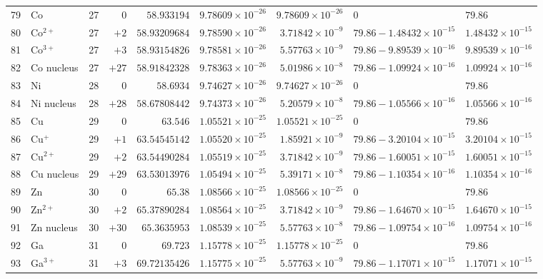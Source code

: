 {\begin{tabular}{@{}r l r r r r r l l@{}}
79 & Co & 27 & $0$ & $58.933194$ & $9.78609{\times}10^{-26}$ & $9.78609{\times}10^{-26}$ & $0$ & $79.86$ \\
80 & Co$^{2+}$ & 27 & $+2$ & $58.93209684$ & $9.78590{\times}10^{-26}$ & $3.71842{\times}10^{-9}$ & $79.86 - 1.48432{\times}10^{-15}$ & $1.48432{\times}10^{-15}$ \\
81 & Co$^{3+}$ & 27 & $+3$ & $58.93154826$ & $9.78581{\times}10^{-26}$ & $5.57763{\times}10^{-9}$ & $79.86 - 9.89539{\times}10^{-16}$ & $9.89539{\times}10^{-16}$ \\
82 & Co nucleus & 27 & $+27$ & $58.91842328$ & $9.78363{\times}10^{-26}$ & $5.01986{\times}10^{-8}$ & $79.86 - 1.09924{\times}10^{-16}$ & $1.09924{\times}10^{-16}$ \\
83 & Ni & 28 & $0$ & $58.6934$ & $9.74627{\times}10^{-26}$ & $9.74627{\times}10^{-26}$ & $0$ & $79.86$ \\
84 & Ni nucleus & 28 & $+28$ & $58.67808442$ & $9.74373{\times}10^{-26}$ & $5.20579{\times}10^{-8}$ & $79.86 - 1.05566{\times}10^{-16}$ & $1.05566{\times}10^{-16}$ \\
85 & Cu & 29 & $0$ & $63.546$ & $1.05521{\times}10^{-25}$ & $1.05521{\times}10^{-25}$ & $0$ & $79.86$ \\
86 & Cu$^{+}$ & 29 & $+1$ & $63.54545142$ & $1.05520{\times}10^{-25}$ & $1.85921{\times}10^{-9}$ & $79.86 - 3.20104{\times}10^{-15}$ & $3.20104{\times}10^{-15}$ \\
87 & Cu$^{2+}$ & 29 & $+2$ & $63.54490284$ & $1.05519{\times}10^{-25}$ & $3.71842{\times}10^{-9}$ & $79.86 - 1.60051{\times}10^{-15}$ & $1.60051{\times}10^{-15}$ \\
88 & Cu nucleus & 29 & $+29$ & $63.53013976$ & $1.05494{\times}10^{-25}$ & $5.39171{\times}10^{-8}$ & $79.86 - 1.10354{\times}10^{-16}$ & $1.10354{\times}10^{-16}$ \\
89 & Zn & 30 & $0$ & $65.38$ & $1.08566{\times}10^{-25}$ & $1.08566{\times}10^{-25}$ & $0$ & $79.86$ \\
90 & Zn$^{2+}$ & 30 & $+2$ & $65.37890284$ & $1.08564{\times}10^{-25}$ & $3.71842{\times}10^{-9}$ & $79.86 - 1.64670{\times}10^{-15}$ & $1.64670{\times}10^{-15}$ \\
91 & Zn nucleus & 30 & $+30$ & $65.3635953$ & $1.08539{\times}10^{-25}$ & $5.57763{\times}10^{-8}$ & $79.86 - 1.09754{\times}10^{-16}$ & $1.09754{\times}10^{-16}$ \\
92 & Ga & 31 & $0$ & $69.723$ & $1.15778{\times}10^{-25}$ & $1.15778{\times}10^{-25}$ & $0$ & $79.86$ \\
93 & Ga$^{3+}$ & 31 & $+3$ & $69.72135426$ & $1.15775{\times}10^{-25}$ & $5.57763{\times}10^{-9}$ & $79.86 - 1.17071{\times}10^{-15}$ & $1.17071{\times}10^{-15}$ \\

\end{tabular}}
